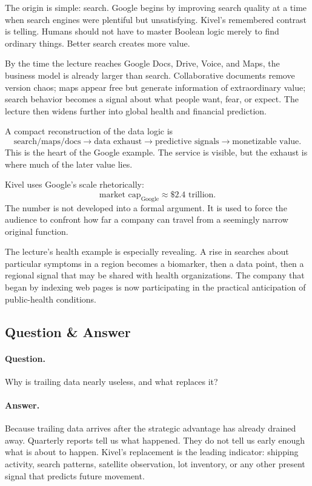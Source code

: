 The origin is simple: search. Google begins by improving search quality at a time when search engines were plentiful but unsatisfying. Kivel's remembered contrast is telling. Humans should not have to master Boolean logic merely to find ordinary things. Better search creates more value.

By the time the lecture reaches Google Docs, Drive, Voice, and Maps, the business model is already larger than search. Collaborative documents remove version chaos; maps appear free but generate information of extraordinary value; search behavior becomes a signal about what people want, fear, or expect. The lecture then widens further into global health and financial prediction.

A compact reconstruction of the data logic is
\begin{equation}
\text{search/maps/docs} \to \text{data exhaust} \to \text{predictive signals} \to \text{monetizable value}.
\end{equation}
This is the heart of the Google example. The service is visible, but the exhaust is where much of the later value lies.

Kivel uses Google's scale rhetorically:
\begin{equation}
\text{market cap}_{\text{Google}} \approx \$2.4 \text{ trillion}.
\end{equation}
The number is not developed into a formal argument. It is used to force the audience to confront how far a company can travel from a seemingly narrow original function.

The lecture's health example is especially revealing. A rise in searches about particular symptoms in a region becomes a biomarker, then a data point, then a regional signal that may be shared with health organizations. The company that began by indexing web pages is now participating in the practical anticipation of public-health conditions.

\subsection{Question \& Answer}

\paragraph{Question.} Why is trailing data nearly useless, and what replaces it?

\paragraph{Answer.} Because trailing data arrives after the strategic advantage has already drained away. Quarterly reports tell us what happened. They do not tell us early enough what is about to happen. Kivel's replacement is the leading indicator: shipping activity, search patterns, satellite observation, lot inventory, or any other present signal that predicts future movement.

